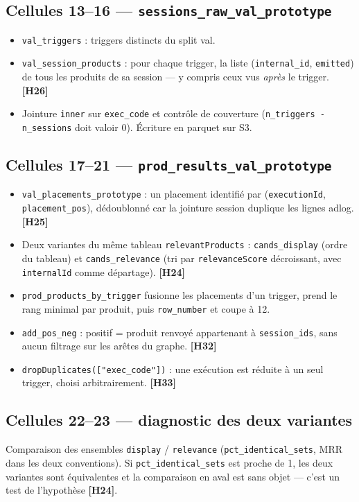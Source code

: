 \documentclass[11pt,a4paper]{article}
\newcommand{\code}[1]{\texttt{\small #1}}
\newcommand{\hyp}[1]{\textcolor{hypcol}{\textbf{\small [#1]}}}
\begin{document}
\subsection*{Cellules 13--16 --- \code{sessions\_raw\_val\_prototype}}
\begin{itemize}[nosep,leftmargin=*]
  \item \code{val\_triggers} : triggers distincts du split val.
  \item \code{val\_session\_products} : pour chaque trigger, la liste
        (\code{internal\_id}, \code{emitted}) de tous les produits de sa session ---
        y compris ceux vus \emph{après} le trigger. \hyp{H26}
  \item Jointure \code{inner} sur \code{exec\_code} et contrôle de couverture
        (\code{n\_triggers - n\_sessions} doit valoir 0). Écriture en parquet sur S3.
\end{itemize}

\subsection*{Cellules 17--21 --- \code{prod\_results\_val\_prototype}}
\begin{itemize}[nosep,leftmargin=*]
  \item \code{val\_placements\_prototype} : un placement identifié par
        (\code{executionId}, \code{placement\_pos}), dédoublonné car la jointure
        session duplique les lignes adlog. \hyp{H25}
  \item Deux variantes du même tableau \code{relevantProducts} :
        \code{cands\_display} (ordre du tableau) et \code{cands\_relevance}
        (tri par \code{relevanceScore} décroissant, avec \code{internalId} comme
        départage). \hyp{H24}
  \item \code{prod\_products\_by\_trigger} fusionne les placements d'un trigger, prend
        le rang minimal par produit, puis \code{row\_number} et coupe à 12.
  \item \code{add\_pos\_neg} : positif = produit renvoyé appartenant à
        \code{session\_ids}, sans aucun filtrage sur les arêtes du graphe. \hyp{H32}
  \item \code{dropDuplicates(["exec\_code"])} : une exécution est réduite à un seul
        trigger, choisi arbitrairement. \hyp{H33}
\end{itemize}

\subsection*{Cellules 22--23 --- diagnostic des deux variantes}
Comparaison des ensembles \code{display} / \code{relevance}
(\code{pct\_identical\_sets}, MRR dans les deux conventions). Si
\code{pct\_identical\_sets} est proche de 1, les deux variantes sont équivalentes et
la comparaison en aval est sans objet --- c'est un test de l'hypothèse \hyp{H24}.
\end{document}
